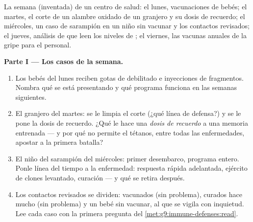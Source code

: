 \begin{problem}\label{pb:g9:immune-defenses:1}
La semana (inventada) de un centro de salud: el lunes, vacunaciones de
bebés; el martes, el corte de un alambre oxidado de un granjero y su
dosis de recuerdo; el miércoles, un caso de sarampión en un niño sin
vacunar y los contactos revisados; el jueves, análisis de  que
leen los niveles de ; el viernes, las vacunas anuales de la
gripe para el personal.

\medskip\noindent\textbf{Parte I --- Los casos de la semana.}
\begin{enumerate}
  \item Los bebés del lunes reciben gotas de  debilitado e
        inyecciones de fragmentos. Nombra qué se está presentando y qué
        programa funciona en las semanas siguientes.
  \item El granjero del martes: se le limpia el corte (¿qué línea de
        defensa?) y se le pone la dosis de recuerdo. ¿Qué le hace una
        \emph{dosis de recuerdo} a una memoria entrenada --- y por qué
        no permite el tétanos, entre todas las enfermedades, apostar a
        la primera batalla?
  \item El niño del sarampión del miércoles: primer desembarco,
        programa entero. Ponle línea del tiempo a la enfermedad:
        respuesta rápida adelantada, ejército de clones levantado,
        curación --- y qué se retira después.
  \item Los contactos revisados se dividen: vacunados (sin problema),
        curados hace mucho (sin problema) y un bebé sin vacunar, al que
        se vigila con inquietud. Lee cada caso con la primera pregunta
        del \cref{met:g9:immune-defenses:read}.
\end{enumerate}


\end{problem}
